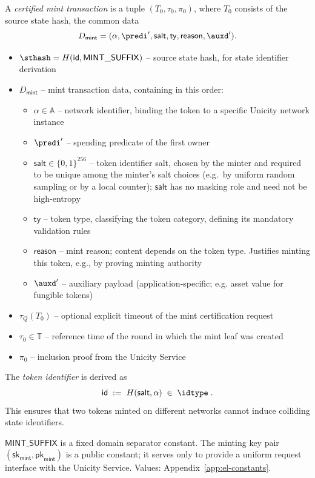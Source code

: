 A \emph{certified mint transaction} is a tuple $(T_0, \tau_0, \pi_0)$, where $T_0$ consists of the source state hash, the common data
\[
D_\mathsf{mint} = (\alpha, \predi', \mathsf{salt}, \mathsf{ty}, \mathsf{reason}, \auxd') .
\]
\begin{itemize}
	\item $\sthash = H(\mathsf{id}, \mathsf{MINT\_SUFFIX})$ -- source state hash, for state identifier derivation
	\item $D_\mathsf{mint}$ -- mint transaction data, containing in this order:
	\begin{itemize}
		\item $\alpha \in \mathbb{A}$ -- network identifier, binding the token to a specific Unicity network instance
		\item $\predi'$ -- spending predicate of the first owner
		\item $\mathsf{salt} \in \{0,1\}^{256}$ -- token identifier salt, chosen by the minter and required to be unique among the minter's salt choices (e.g.\ by uniform random sampling or by a local counter); $\mathsf{salt}$ has no masking role and need not be high-entropy
		\item $\mathsf{ty}$ -- token type, classifying the token category, defining its mandatory validation rules
		\item $\mathsf{reason}$ -- mint reason; content depends on the token type. Justifies minting this token, e.g., by proving minting authority
		\item $\auxd'$ -- auxiliary payload (application-specific; e.g. asset value for fungible tokens)
	\end{itemize}
	\item $\tau_Q(T_0)$ -- optional explicit timeout of the mint certification request
	\item $\tau_0\in\mathbb T$ -- reference time of the round in which the mint leaf was created
	\item $\pi_0$ -- inclusion proof from the Unicity Service
\end{itemize}

The \emph{token identifier} is derived as
\[
\mathsf{id} \;:=\; H(\mathsf{salt}, \alpha) \;\in\; \idtype \;.
\]
This ensures that two tokens minted on different networks cannot induce colliding state identifiers.

$\mathsf{MINT\_SUFFIX}$ is a fixed domain separator constant. The minting key pair $(\mathsf{sk}_\mathsf{mint}, \mathsf{pk}_\mathsf{mint})$ is a public constant; it serves only to provide a uniform request interface with the Unicity Service. Values: Appendix~\ref{app:el-constants}.

